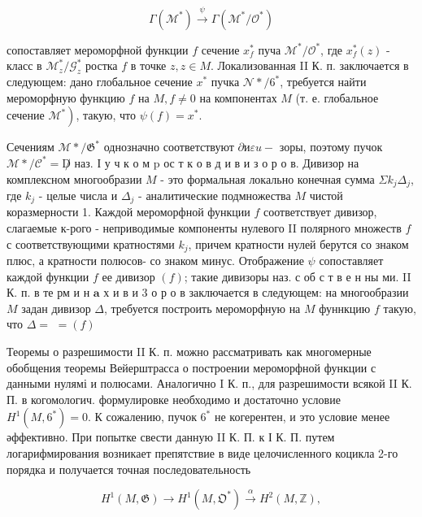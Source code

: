 \documentclass[10pt]{article}
\begin{document}
\[

\Gamma\left(\mathscr{M}^{*}\right) \stackrel{\psi}{\longrightarrow} \Gamma\left(\mathscr{M}^{*} / \mathscr{O}^{*}\right)

\]



сопоставляет мероморфной функции $f$ сечение $x_{f}^{*}$ пуча $\mathscr{M}^{*} / \mathscr{O}^{*}$, где $x_{f}^{*}(z)$ - класс в $\mathscr{M}_{z}^{*} / \mathscr{G}_{z}^{*}$ ростка $f$ в точке $z, z \in M$. Локализованная II К. п. заключается в следующем: дано глобальное сечение $x^{*}$ пучка $\mathscr{N} * / 6^{*}$, требуется найти мероморфную функцию $f$ на $M, f \neq 0$ на компонентах $M$ (т. е. глобальное сечение $\left.\mathscr{M}^{*}\right)$, такую, что $\psi(f)=x^{*}$.



Сечениям $\mathscr{M} * / \mathfrak{G}^{*}$ однозначно соответствуют $\partial и \varepsilon u-$ зоры, поэтому пучок $\mathscr{M} * / \mathscr{C}^{*}=\not D$ наз. І у ч к о м $\mathrm{p}$ ос т к о в д и в и з о р о в. Дивизор на комплексном многообразии $M$ - это формальная локально конечная сумма $\Sigma k_{j} \Delta_{j}$, где $k_{j}$ - целые числа и $\Delta_{j}$ - аналитические подмножества $M$ чистой коразмерности 1. Каждой мероморфной функции $f$ соответствует дивизор, слагаемые к-рого - неприводимые компоненты нулевого II полярного множеств $f$ с соответствующими кратностями $k_{j}$, причем кратности нулей берутся со знаком плюс, а кратности полюсов- со знаком минус. Отображение $\psi$ сопоставляет каждой функции $f$ ее дивизор $(f)$; такие дивизоры наз. с об с т в е н ны ми. II К. п. в те рм и н $\mathbf{a}$ х и в и 3 о р о в заключается в следующем: на многообразии $M$ задан дивизор $\Delta$, требуется построить мероморфную на $M$ фуннкцию $f$ такую, что $\Delta=$ $=(f)$



Теоремы о разрешимости II К. п. можно рассматривать как многомерные обобщения теоремы Вейерштрасса о построении мероморфной функции с данными нулямі и полюсами. Аналогично I К. п., для разрешимости всякой II К. П. в когомологич. формулировке необходимо и достаточно условие $H^{1}\left(M, 6^{*}\right)=0$. К сожалению, пучок $6^{*}$ не когерентен, и это условие менее әффективно. При попытке свести данную II К. П. к І К. П. путем логарифмирования возникает препятствие в виде целочисленного коцикла 2-го порядка и получается точная последовательность



\[

H^{1}(M, \mathfrak{G}) \longrightarrow H^{1}\left(M, \mathfrak{O}^{*}\right) \stackrel{\alpha}{\longrightarrow} H^{2}(M, \mathbb{Z}),

\]
\end{document}
